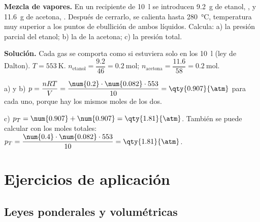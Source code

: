 \begin{example}
    \textbf{Mezcla de vapores.} En un recipiente de \qty{10}{\litre} se introducen \qty{9.2}{\gram} de etanol, , y
    \qty{11.6}{\gram} de acetona, . Después de cerrarlo, se calienta hasta \qty{280}{\degreeCelsius}, temperatura muy
    superior a los puntos de ebullición de ambos líquidos. Calcula: a) la presión parcial del etanol; b) la de la acetona; c) la
    presión total.

    \textbf{Solución.} Cada gas se comporta como si estuviera solo en los \qty{10}{\litre} (ley de Dalton). \(T = \qty{553}{\kelvin}\).
    \(n_{\text{etanol}} = \dfrac{\num{9.2}}{46} = \qty{0.2}{\mole}\); \(n_{\text{acetona}} = \dfrac{\num{11.6}}{58} = \qty{0.2}{\mole}\).

    a) y b) \(p = \dfrac{n R T}{V} = \dfrac{\num{0.2} \cdot \num{0.082} \cdot 553}{10} = \qty{0.907}{\atm}\) para cada uno, porque hay los
    mismos moles de los dos.

    c) \(p_T = \num{0.907} + \num{0.907} = \qty{1.81}{\atm}\). También se puede calcular con los moles totales:
    \(p_T = \dfrac{\num{0.4} \cdot \num{0.082} \cdot 553}{10} = \qty{1.81}{\atm}\).
\end{example}

\section{Ejercicios de aplicación}\label{sec:ud1-aplicacion}

\subsection{Leyes ponderales y volumétricas}

